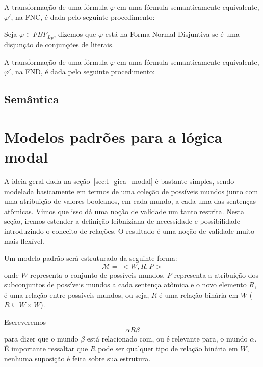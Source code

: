A transformação de uma fórmula $\varphi$ em uma fórmula semanticamente
equivalente, $\varphi '$, na FNC, é dada pelo seguinte procedimento:

\begin{definition}
    Seja $\varphi \in FBF_{L_P}$, dizemos que $\varphi$ está na Forma Normal
    Disjuntiva se é uma disjunção de conjunções de literais.
\end{definition}

A transformação de uma fórmula $\varphi$ em uma fórmula semanticamente
equivalente, $\varphi '$, na FND, é dada pelo seguinte procedimento:


\subsection{Semântica}

\section{Modelos padrões para a lógica modal}
\label{sec:modelos_padroes}

A ideia geral dada na seção~\ref{sec:l_gica_modal} é bastante simples, sendo
modelada basicamente em termos de uma coleção de possíveis mundos junto com uma
atribuição de valores booleanos, em cada mundo, a cada uma das sentenças
at\^omicas. Vimos que isso dá uma noção de validade um tanto restrita.
Nesta seção, iremos estender a definição leibniziana de necessidade e
possibilidade introduzindo o conceito de relações. O resultado é uma noção de
validade muito mais flexível.

Um modelo padrão será estruturado da seguinte forma:
\begin{equation}
    \label{eq:mod_padrao}
    \mathcal{M} =\ <W,R,P>
\end{equation}
onde $W$ representa o conjunto de possíveis mundos, $P$ representa a atribuição
dos subconjuntos de possíveis mundos a cada sentença at\^omica e o novo elemento
$R$, é uma relação entre possíveis mundos, ou seja, $R$ é uma relação binária em
$W$ ($R \subseteq W \times W$).

Escreveremos
\begin{equation}
    \alpha R \beta
\end{equation}
para dizer que o mundo $\beta$ está relacionado com, ou é relevante para, o
mundo $\alpha$. É importante ressaltar que $R$ pode ser qualquer tipo de relação
binária em $W$, nenhuma suposição é feita sobre sua estrutura.

